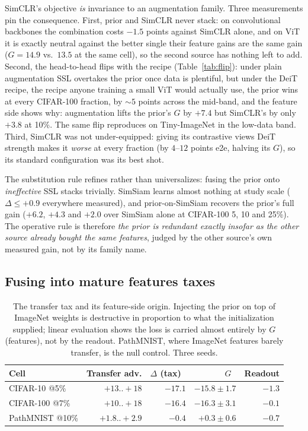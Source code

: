 SimCLR's objective \emph{is} invariance to an augmentation family. Three
measurements pin the consequence. First, prior and SimCLR never stack:
on convolutional backbones the combination costs $-1.5$ points against
SimCLR alone, and on ViT it is exactly neutral against the better single
their feature gains are the same gain ($G = 14.9$ vs.\ $13.5$ at the
same cell), so the second source has nothing left to add. Second, the
head-to-head flips with the recipe (Table~\ref{tab:flip}): under plain
augmentation SSL overtakes the prior once data is plentiful, but under
the DeiT recipe, the recipe anyone training a small ViT would actually
use, the prior wins at every CIFAR-100 fraction, by ${\sim}5$ points
across the mid-band, and the feature side shows why: augmentation lifts the
prior's $G$ by $+7.4$ but SimCLR's by only $+3.8$ at 10\%. The same flip
reproduces on Tiny-ImageNet in the low-data band. Third, SimCLR was not
under-equipped: giving its contrastive views DeiT strength makes it
\emph{worse} at every fraction (by $4$--$12$ points e2e, halving its
$G$), so its standard configuration was its best shot.

The substitution rule refines rather than universalizes: fusing the prior
onto \emph{ineffective} SSL stacks trivially. SimSiam learns almost
nothing at study scale ($\Delta \leq +0.9$ everywhere measured), and
prior-on-SimSiam recovers the prior's full gain ($+6.2$, $+4.3$ and
$+2.0$ over SimSiam alone at CIFAR-100 5, 10 and 25\%). The operative rule is therefore
\emph{the prior is redundant exactly insofar as the other source already
bought the same features}, judged by the other source's own measured
gain, not by its family name.

\subsection{Fusing into mature features taxes}\label{sec:taxsub}
\begin{table}[t]
\caption{The transfer tax and its feature-side origin. Injecting the
prior on top of ImageNet weights is destructive in proportion to what the
initialization supplied; linear evaluation shows the loss is carried almost
entirely by $G$ (features), not by the readout. PathMNIST, where
ImageNet features barely transfer, is the null control. Three seeds.}
\label{tab:tax}
\centering\scriptsize
\setlength{\tabcolsep}{2.6pt}
\begin{tabular}{@{}lrrrr@{}}
\toprule
Cell & Transfer adv. & $\Delta$ (tax)~\up & $G$~\up & Readout \\
\midrule
CIFAR-10 @5\% & $+13..{+}18$ & $-17.1$ & $-15.8 \pm 1.7$ & $-1.3$ \\
CIFAR-100 @7\% & $+10..{+}18$ & $-16.4$ & $-16.3 \pm 3.1$ & $-0.1$ \\
PathMNIST @10\% & $+1.8..{+}2.9$ & $-0.4$ & $+0.3 \pm 0.6$ & $-0.7$ \\
\bottomrule
\end{tabular}
\end{table}

